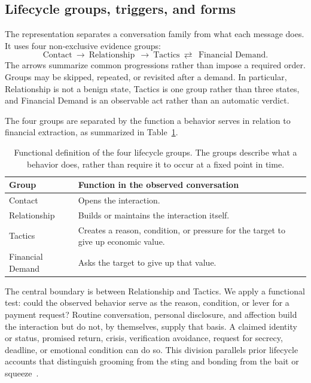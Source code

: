 \documentclass[letterpaper,11pt]{article}
\begin{document}
\subsection{Lifecycle groups, triggers, and forms}
The representation separates a conversation family from what each message does.
It uses four non-exclusive evidence groups:
\begin{equation}
 \text{Contact}\ \longrightarrow\ \text{Relationship}\
 \ \longrightarrow\ \text{Tactics}\ \rightleftarrows\
 \ \text{Financial Demand}.
 \label{eq:lifecycle}
\end{equation}
The arrows summarize common progressions rather than impose a required order.
Groups may be skipped, repeated, or revisited after a demand. In particular,
Relationship is not a benign state, Tactics is one group rather than three states,
and Financial Demand is an observable act rather than an automatic verdict.

The four groups are separated by the function a behavior serves in relation to
financial extraction, as summarized in Table~\ref{tab:lifecycle-functions}.

\begin{table}[tb]
\centering\small
\begin{tabularx}{\linewidth}{@{}p{.20\linewidth}X@{}}
\toprule
Group & Function in the observed conversation \\
\midrule
Contact & Opens the interaction. \\
Relationship & Builds or maintains the interaction itself. \\
Tactics & Creates a reason, condition, or pressure for the target to give up economic value. \\
Financial Demand & Asks the target to give up that value. \\
\bottomrule
\end{tabularx}
\caption{Functional definition of the four lifecycle groups. The groups describe
what a behavior does, rather than require it to occur at a fixed point in time.}
\label{tab:lifecycle-functions}
\end{table}

The central boundary is between Relationship and Tactics. We apply a functional
test: could the observed behavior serve as the reason, condition, or lever for a
payment request? Routine conversation, personal disclosure, and affection build
the interaction but do not, by themselves, supply that basis. A claimed identity
or status, promised return, crisis, verification avoidance, request for secrecy,
deadline, or emotional condition can do so. This division parallels prior
lifecycle accounts that distinguish grooming from the sting and bonding from the
bait or squeeze~\cite{whitty2013scammers,oak2025anna}.
\end{document}
